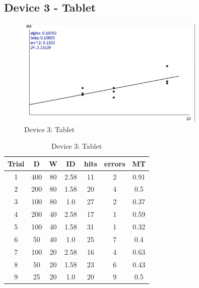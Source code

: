 \documentclass[a4paper,twoside,10pt]{article}
\begin{document}
\subsection*{Device 3 - Tablet}
\vspace{1cm}
\begin{figure}[ht]
	\centering
		\includegraphics[width=0.80\textwidth]{Tablet.pdf}
	\caption{Device 3: Tablet}
	\label{fig:Tablet}
\end{figure}
\vspace{1cm}
\begin{table}[ht]
	\centering
		\begin{tabular}{|c|c|c|c|c|c|c|}
			\hline
			Trial &	D	& W	& ID	& hits	& errors	& MT\\
			\hline
			1	& 400	& 80	& 2.58	& 11	& 2	& 0.91 \\
			2	& 200	& 80	& 1.58	& 20	& 4	& 0.5 \\
			3	& 100	& 80	& 1.0	& 27	& 2	& 0.37 \\
			4	& 200	& 40	& 2.58	& 17	& 1 & 0.59 \\
			5	& 100	& 40	& 1.58	& 31	& 1	& 0.32 \\
			6	& 50	& 40	& 1.0	& 25	& 7	& 0.4 \\
			7	& 100	& 20	& 2.58	& 16	& 4	& 0.63 \\
			8	& 50	& 20	& 1.58	& 23	& 6	& 0.43 \\
			9	& 25	& 20	& 1.0	& 20	& 9	& 0.5 \\
			\hline
		\end{tabular}
	\caption{Device 3: Tablet}
	\label{tab:PerformanceOfTablet}
\end{table}


\vspace{1cm}
\newpage 
\end{document}
